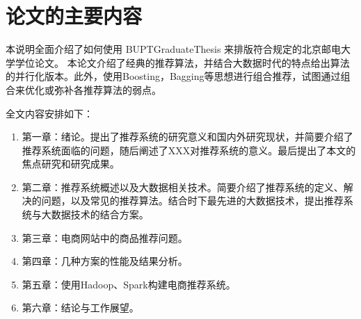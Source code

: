 \section{论文的主要内容}
本说明全面介绍了如何使用 BUPTGraduateThesis 来排版符合规定的北京邮电大学学位论文。
本论文介绍了经典的推荐算法，并结合大数据时代的特点给出算法的并行化版本。此外，使用Boosting，Bagging等思想进行组合推荐，试图通过组合来优化或弥补各推荐算法的弱点。

全文内容安排如下：
\begin{enumerate}
\item 第一章：绪论。提出了推荐系统的研究意义和国内外研究现状，并简要介绍了推荐系统面临的问题，随后阐述了XXX对推荐系统的意义。最后提出了本文的焦点研究和研究成果。
\item 第二章：推荐系统概述以及大数据相关技术。简要介绍了推荐系统的定义、解决的问题，以及常见的推荐算法。结合时下最先进的大数据技术，提出推荐系统与大数据技术的结合方案。
\item 第三章：电商网站中的商品推荐问题。
\item 第四章：几种方案的性能及结果分析。
\item 第五章：使用Hadoop、Spark构建电商推荐系统。
\item 第六章：结论与工作展望。
\end{enumerate}

\ifx\usechapbib\empty
\nocite{BSTcontrol}
\setcounter{NAT@ctr}{0}


\fi
